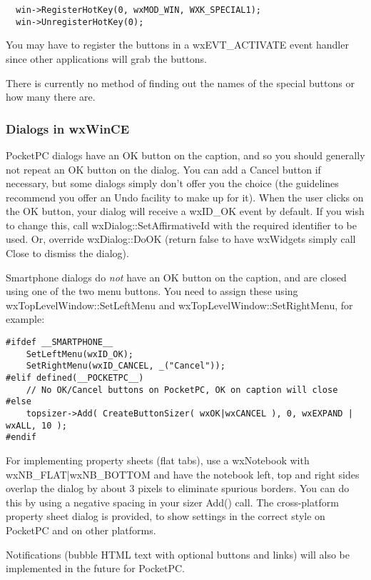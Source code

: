 \begin{verbatim}
  win->RegisterHotKey(0, wxMOD_WIN, WXK_SPECIAL1);
  win->UnregisterHotKey(0);
\end{verbatim}

You may have to register the buttons in a wxEVT_ACTIVATE event handler
since other applications will grab the buttons.

There is currently no method of finding out the names of the special
buttons or how many there are.

\subsubsection{Dialogs in wxWinCE}

PocketPC dialogs have an OK button on the caption, and so you should generally
not repeat an OK button on the dialog. You can add a Cancel button if necessary, but some dialogs
simply don't offer you the choice (the guidelines recommend you offer an Undo facility
to make up for it). When the user clicks on the OK button, your dialog will receive
a wxID\_OK event by default. If you wish to change this, call wxDialog::SetAffirmativeId
with the required identifier to be used. Or, override wxDialog::DoOK (return false to
have wxWidgets simply call Close to dismiss the dialog).

Smartphone dialogs do {\it not} have an OK button on the caption, and are closed
using one of the two menu buttons. You need to assign these using wxTopLevelWindow::SetLeftMenu
and wxTopLevelWindow::SetRightMenu, for example:

\begin{verbatim}
#ifdef __SMARTPHONE__
    SetLeftMenu(wxID_OK);
    SetRightMenu(wxID_CANCEL, _("Cancel"));
#elif defined(__POCKETPC__)
    // No OK/Cancel buttons on PocketPC, OK on caption will close
#else
    topsizer->Add( CreateButtonSizer( wxOK|wxCANCEL ), 0, wxEXPAND | wxALL, 10 );
#endif
\end{verbatim}

For implementing property sheets (flat tabs), use a wxNotebook with wxNB_FLAT|wxNB_BOTTOM
and have the notebook left, top and right sides overlap the dialog by about 3 pixels
to eliminate spurious borders. You can do this by using a negative spacing in your
sizer Add() call. The cross-platform property sheet dialog  is
provided, to show settings in the correct style on PocketPC and on other platforms.

Notifications (bubble HTML text with optional buttons and links) will also be
implemented in the future for PocketPC.

